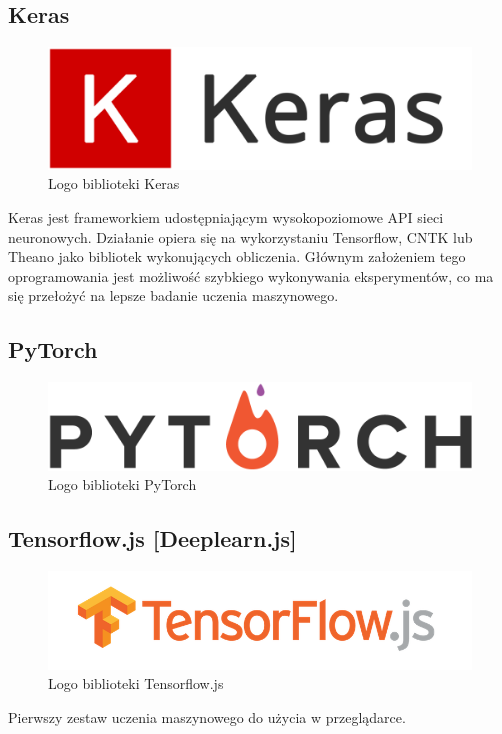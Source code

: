 \documentclass[a4paper,twoside,titlepage,openright]{book}
\begin{document}
\subsection{Keras}
\begin{figure}[h]
	\centering
			\includegraphics[resolution=120]{Keras.png}
		\caption{Logo biblioteki Keras}
\end{figure}
Keras jest frameworkiem udostępniającym wysokopoziomowe API sieci neuronowych. Działanie opiera się na wykorzystaniu Tensorflow, CNTK lub Theano jako bibliotek wykonujących obliczenia. Głównym założeniem tego oprogramowania jest możliwość szybkiego wykonywania eksperymentów, co ma się przełożyć na lepsze badanie uczenia maszynowego.

\subsection{PyTorch}
\begin{figure}[h]
	\centering
			\includegraphics[resolution=120]{PyTorch.png}
		\caption{Logo biblioteki PyTorch}
\end{figure}

\subsection{Tensorflow.js [Deeplearn.js]}
\begin{figure}[h]
	\centering
			\includegraphics[resolution=120]{TensorflowJS.png}
		\caption{Logo biblioteki Tensorflow.js}
\end{figure}
Pierwszy zestaw uczenia maszynowego do użycia w przeglądarce. 
\end{document}
